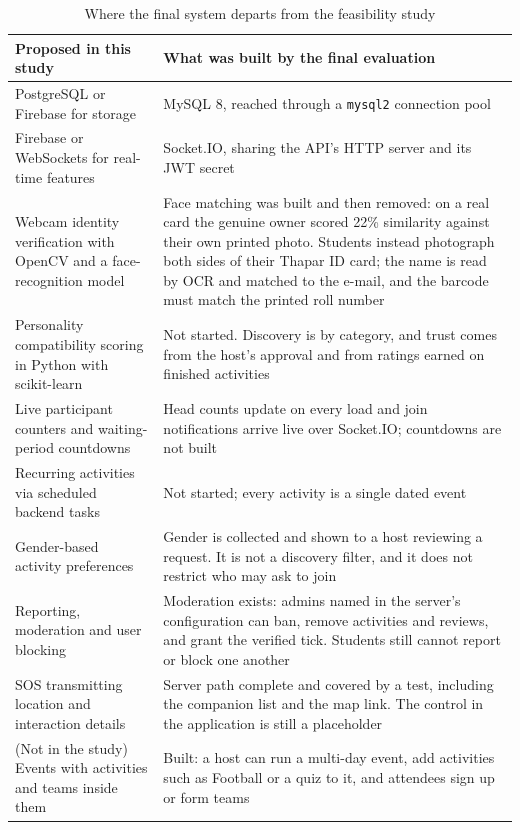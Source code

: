 \documentclass{tietreport}
\begin{document}
\begin{table}[htbp]
\centering
\begin{tabular}{|L{4.6cm}|L{6.9cm}|}
\hline
\textbf{Proposed in this study} & \textbf{What was built by the final evaluation} \\
\hline
PostgreSQL or Firebase for storage &
MySQL 8, reached through a \texttt{mysql2} connection pool \\
\hline
Firebase or WebSockets for real-time features &
Socket.IO, sharing the API's HTTP server and its JWT secret \\
\hline
Webcam identity verification with OpenCV and a face-recognition model &
Face matching was built and then removed: on a real card the genuine owner scored 22\%
similarity against their own printed photo. Students instead photograph both sides of
their Thapar ID card; the name is read by OCR and matched to the e-mail, and the
barcode must match the printed roll number \\
\hline
Personality compatibility scoring in Python with scikit-learn &
Not started. Discovery is by category, and trust comes from the host's approval and from
ratings earned on finished activities \\
\hline
Live participant counters and waiting-period countdowns &
Head counts update on every load and join notifications arrive live over Socket.IO;
countdowns are not built \\
\hline
Recurring activities via scheduled backend tasks &
Not started; every activity is a single dated event \\
\hline
Gender-based activity preferences &
Gender is collected and shown to a host reviewing a request. It is not a discovery
filter, and it does not restrict who may ask to join \\
\hline
Reporting, moderation and user blocking &
Moderation exists: admins named in the server's configuration can ban, remove
activities and reviews, and grant the verified tick. Students still cannot report or
block one another \\
\hline
SOS transmitting location and interaction details &
Server path complete and covered by a test, including the companion list and the map
link. The control in the application is still a placeholder \\
\hline
(Not in the study) Events with activities and teams inside them &
Built: a host can run a multi-day event, add activities such as Football or a quiz to
it, and attendees sign up or form teams \\
\hline
\end{tabular}
\caption{Where the final system departs from the feasibility study}
\label{tab:divergence}
\end{table}
\end{document}
